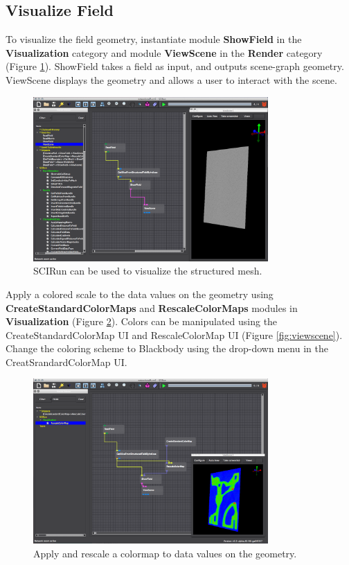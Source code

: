 \documentclass[fleqn,11pt,openany]{book}
\begin{document}
\subsection{Visualize Field}\label{visualize}

To visualize the field geometry, instantiate module \textbf{ShowField}
in the \textbf{Visualization} category and module \textbf{ViewScene}
in the \textbf{Render} category (Figure \ref{fig:colormap}).
ShowField takes a field as input, and outputs scene-graph geometry.
ViewScene displays the geometry and allows a user to interact with the scene.

\begin{figure}[H]
\center
\includegraphics[width=0.8\textwidth]{BasicTutorial_figures/viewscene.png}
\caption{SCIRun can be used to visualize the structured mesh.}
\label{fig:colormap}
\end{figure}


Apply a colored scale to the data values on the geometry using \textbf{CreateStandardColorMaps}
and \textbf{RescaleColorMaps} modules in \textbf{Visualization} (Figure \ref{fig:rescale}). Colors can be manipulated using the CreateStandardColorMap UI and RescaleColorMap UI (Figure \ref{fig:viewscene}). Change the coloring scheme to Blackbody using the drop-down menu in the CreatSrandardColorMap UI.  

\begin{figure}[H]
\center
\includegraphics[width=0.8\textwidth]{BasicTutorial_figures/colorscale.png}
\caption{Apply and rescale a colormap to data values on the geometry.}
\label{fig:rescale}
\end{figure}
\end{document}
